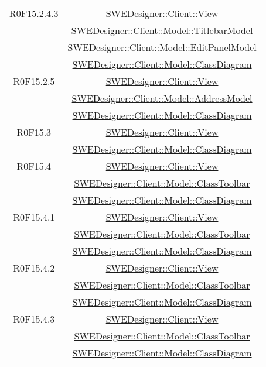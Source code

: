 \documentclass[../SpecificaTecnica.tex]{subfiles}
\begin{document}
\begin{longtable}{|c|c|}
		R0F15.2.4.3 & \hyperlink{SWEDesigner::Client::View}{SWEDesigner::Client::View}\\& \hyperlink{SWEDesigner::Client::Model::TitlebarModel}{SWEDesigner::Client::Model::TitlebarModel}\\& \hyperlink{SWEDesigner::Client::Model::EditPanelModel}{SWEDesigner::Client::Model::EditPanelModel}\\& \hyperlink{SWEDesigner::Client::Model::ClassDiagram}{SWEDesigner::Client::Model::ClassDiagram}\\\hline
		R0F15.2.5 & \hyperlink{SWEDesigner::Client::View}{SWEDesigner::Client::View}\\& \hyperlink{SWEDesigner::Client::Model::AddressModel}{SWEDesigner::Client::Model::AddressModel}\\& \hyperlink{SWEDesigner::Client::Model::ClassDiagram}{SWEDesigner::Client::Model::ClassDiagram}\\\hline
		R0F15.3 & \hyperlink{SWEDesigner::Client::View}{SWEDesigner::Client::View}\\& \hyperlink{SWEDesigner::Client::Model::ClassDiagram}{SWEDesigner::Client::Model::ClassDiagram}\\\hline
		R0F15.4 & \hyperlink{SWEDesigner::Client::View}{SWEDesigner::Client::View}\\& \hyperlink{SWEDesigner::Client::Model::ClassToolbar}{SWEDesigner::Client::Model::ClassToolbar}\\& \hyperlink{SWEDesigner::Client::Model::ClassDiagram}{SWEDesigner::Client::Model::ClassDiagram}\\\hline
		R0F15.4.1 & \hyperlink{SWEDesigner::Client::View}{SWEDesigner::Client::View}\\& \hyperlink{SWEDesigner::Client::Model::ClassToolbar}{SWEDesigner::Client::Model::ClassToolbar}\\& \hyperlink{SWEDesigner::Client::Model::ClassDiagram}{SWEDesigner::Client::Model::ClassDiagram}\\\hline
		R0F15.4.2 & \hyperlink{SWEDesigner::Client::View}{SWEDesigner::Client::View}\\& \hyperlink{SWEDesigner::Client::Model::ClassToolbar}{SWEDesigner::Client::Model::ClassToolbar}\\& \hyperlink{SWEDesigner::Client::Model::ClassDiagram}{SWEDesigner::Client::Model::ClassDiagram}\\\hline
		R0F15.4.3 & \hyperlink{SWEDesigner::Client::View}{SWEDesigner::Client::View}\\& \hyperlink{SWEDesigner::Client::Model::ClassToolbar}{SWEDesigner::Client::Model::ClassToolbar}\\& \hyperlink{SWEDesigner::Client::Model::ClassDiagram}{SWEDesigner::Client::Model::ClassDiagram}\\\hline

\end{longtable}
\end{document}
